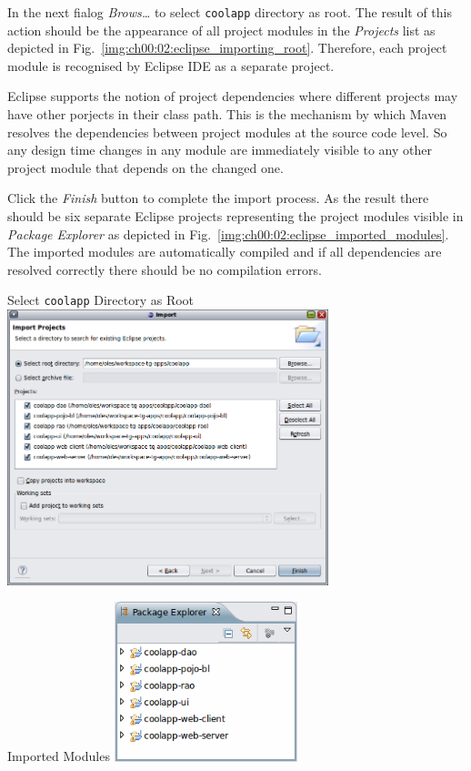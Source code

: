   In the next fialog \emph{Brows\ldots} to select \texttt{coolapp} directory as root.
  The result of this action should be the appearance of all project modules in the \emph{Projects} list as depicted in Fig.~\ref{img:ch00:02:eclipse_importing_root}.  
  Therefore, each project module is recognised by Eclipse IDE as a separate project.
  
  Eclipse supports the notion of project dependencies where different projects may have other porjects in their class path.
  This is the mechanism by which Maven resolves the dependencies between project modules at the source code level.
  So any design time changes in any module are immediately visible to any other project module that depends on the changed one.

  Click the \emph{Finish} button to complete the import process.
  As the result there should be six separate Eclipse projects representing the project modules visible in \emph{Package Explorer} as depicted in Fig.~\ref{img:ch00:02:eclipse_imported_modules}.
  The imported modules are automatically compiled and if all dependencies are resolved correctly there should be no compilation errors.

  \begin{image}{Select \texttt{coolapp} Directory as Root}{\label{img:ch00:02:eclipse_importing_root}}    
    \includegraphics[width=0.7\textwidth]{parts/00-part/chapters/01-application-modules/images/10-eclipse-importing.png}
  \end{image}
 
  \begin{image}{Imported Modules}{\label{img:ch00:02:eclipse_imported_modules}}    
    \includegraphics[width=0.4\textwidth]{parts/00-part/chapters/01-application-modules/images/11-eclipse-imported-modules.png}
  \end{image}  
 

